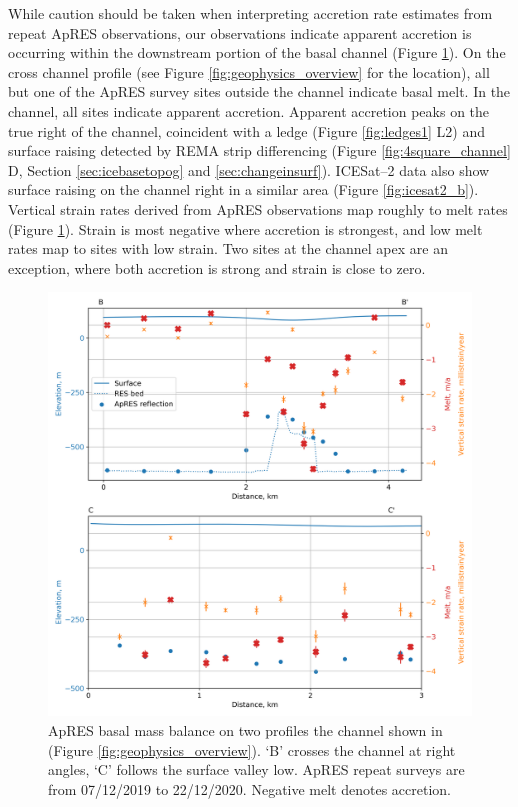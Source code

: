 While caution should be taken when interpreting accretion rate estimates from repeat ApRES observations, our observations indicate apparent accretion is occurring within the downstream portion of the basal channel (Figure \ref{fig:APRES_melt}). 
On the cross channel profile (see Figure \ref{fig:geophysics_overview} for the location), all but one of the ApRES survey sites outside the channel indicate basal melt. In the channel, all sites indicate apparent accretion. Apparent accretion peaks on the true right of the channel, coincident with a ledge (Figure \ref{fig:ledges1} L2) and surface raising detected by REMA strip differencing (Figure \ref{fig:4square_channel} D, Section \ref{sec:icebasetopog} and \ref{sec:changeinsurf}). ICESat--2 data also show surface raising on the channel right in a similar area (Figure \ref{fig:icesat2_b}). 
Vertical strain rates derived from ApRES observations map roughly to melt rates (Figure \ref{fig:APRES_melt}). Strain is most negative where accretion is strongest, and low melt rates map to sites with low strain. Two sites at the channel apex are an exception, where both accretion is strong and strain is close to zero.

\begin{figure}[!ht]
\centering
\includegraphics[width=1\textwidth]{chapters/2/APRES_melt.png}
\caption[ApRES results]{ApRES basal mass balance on two profiles the channel shown in (Figure \ref{fig:geophysics_overview}). `B' crosses the channel at right angles, `C' follows the surface valley low.  ApRES repeat surveys are from 07/12/2019 to 22/12/2020. Negative melt denotes accretion.   }
\label{fig:APRES_melt}
\end{figure}  


